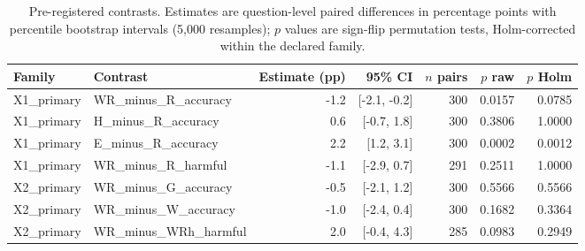 \begin{table}[t]
\centering
\caption{Pre-registered contrasts. Estimates are question-level paired differences in percentage points with percentile bootstrap intervals (5{,}000 resamples); $p$ values are sign-flip permutation tests, Holm-corrected within the declared family.\label{tab:contrasts}}
\begin{adjustbox}{max width=\linewidth}
\begin{tabular}{@{}llrrrrr@{}}
\toprule
Family & Contrast & Estimate (pp) & 95\% CI & $n$ pairs & $p$ raw & $p$ Holm \\
\midrule
X1\_primary & WR\_minus\_R\_accuracy & -1.2 & [-2.1, -0.2] & 300 & 0.0157 & 0.0785 \\
X1\_primary & H\_minus\_R\_accuracy & 0.6 & [-0.7, 1.8] & 300 & 0.3806 & 1.0000 \\
X1\_primary & E\_minus\_R\_accuracy & 2.2 & [1.2, 3.1] & 300 & 0.0002 & 0.0012 \\
X1\_primary & WR\_minus\_R\_harmful & -1.1 & [-2.9, 0.7] & 291 & 0.2511 & 1.0000 \\
X2\_primary & WR\_minus\_G\_accuracy & -0.5 & [-2.1, 1.2] & 300 & 0.5566 & 0.5566 \\
X2\_primary & WR\_minus\_W\_accuracy & -1.0 & [-2.4, 0.4] & 300 & 0.1682 & 0.3364 \\
X2\_primary & WR\_minus\_WRh\_harmful & 2.0 & [-0.4, 4.3] & 285 & 0.0983 & 0.2949 \\
\bottomrule
\end{tabular}
\end{adjustbox}
\end{table}
